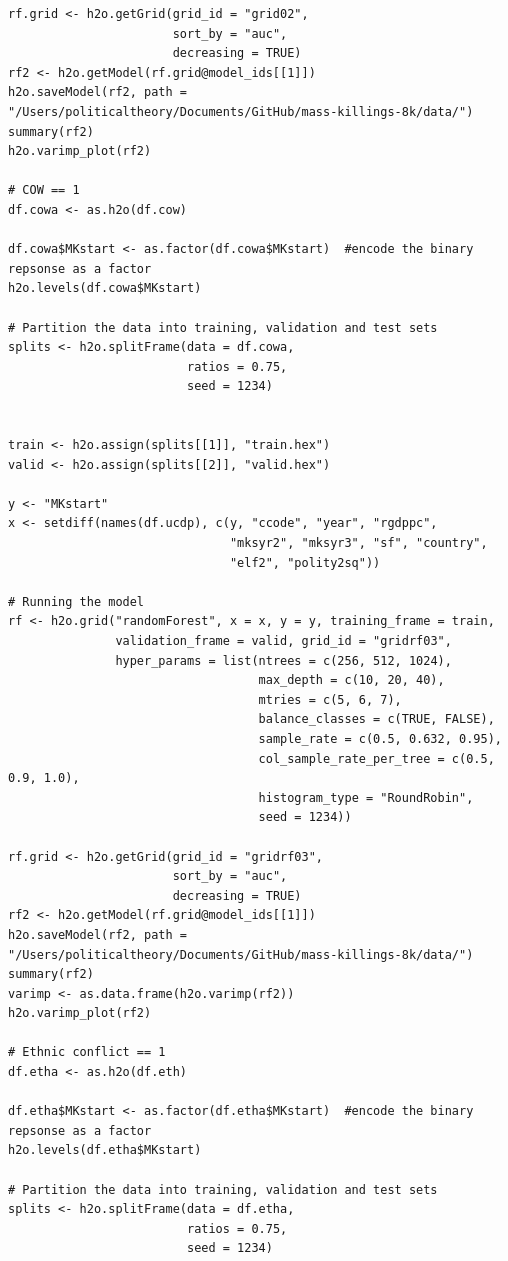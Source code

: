 \begin{verbatim}
rf.grid <- h2o.getGrid(grid_id = "grid02",
                       sort_by = "auc",
                       decreasing = TRUE)
rf2 <- h2o.getModel(rf.grid@model_ids[[1]])
h2o.saveModel(rf2, path = "/Users/politicaltheory/Documents/GitHub/mass-killings-8k/data/")
summary(rf2)
h2o.varimp_plot(rf2)

# COW == 1
df.cowa <- as.h2o(df.cow)

df.cowa$MKstart <- as.factor(df.cowa$MKstart)  #encode the binary repsonse as a factor
h2o.levels(df.cowa$MKstart)

# Partition the data into training, validation and test sets
splits <- h2o.splitFrame(data = df.cowa, 
                         ratios = 0.75,  
                         seed = 1234)  


train <- h2o.assign(splits[[1]], "train.hex")   
valid <- h2o.assign(splits[[2]], "valid.hex") 

y <- "MKstart"
x <- setdiff(names(df.ucdp), c(y, "ccode", "year", "rgdppc",
                               "mksyr2", "mksyr3", "sf", "country",
                               "elf2", "polity2sq")) 

# Running the model
rf <- h2o.grid("randomForest", x = x, y = y, training_frame = train, 
               validation_frame = valid, grid_id = "gridrf03",
               hyper_params = list(ntrees = c(256, 512, 1024),
                                   max_depth = c(10, 20, 40),
                                   mtries = c(5, 6, 7),
                                   balance_classes = c(TRUE, FALSE),
                                   sample_rate = c(0.5, 0.632, 0.95),
                                   col_sample_rate_per_tree = c(0.5, 0.9, 1.0),
                                   histogram_type = "RoundRobin",
                                   seed = 1234)) 

rf.grid <- h2o.getGrid(grid_id = "gridrf03",
                       sort_by = "auc",
                       decreasing = TRUE)
rf2 <- h2o.getModel(rf.grid@model_ids[[1]])
h2o.saveModel(rf2, path = "/Users/politicaltheory/Documents/GitHub/mass-killings-8k/data/")
summary(rf2)
varimp <- as.data.frame(h2o.varimp(rf2))
h2o.varimp_plot(rf2)

# Ethnic conflict == 1
df.etha <- as.h2o(df.eth)

df.etha$MKstart <- as.factor(df.etha$MKstart)  #encode the binary repsonse as a factor
h2o.levels(df.etha$MKstart)

# Partition the data into training, validation and test sets
splits <- h2o.splitFrame(data = df.etha, 
                         ratios = 0.75,  
                         seed = 1234)  



\end{verbatim}
